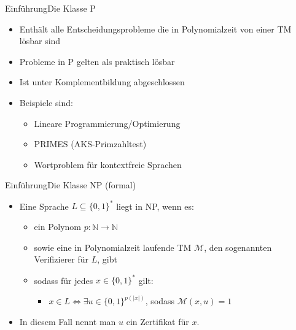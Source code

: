 \documentclass[ignorenonframetext,]{beamer}
\begin{document}
\begin{frame}{Einführung}{Die Klasse P}

\begin{itemize}
\itemsep1pt\parskip0pt
\item
  Enthält alle Entscheidungsprobleme die in Polynomialzeit von einer TM
  lösbar sind
\item
  Probleme in P gelten als praktisch lösbar
\item
  Ist unter Komplementbildung abgeschlossen
\item
  Beispiele sind:

  \begin{itemize}
  \itemsep1pt\parskip0pt
  \item
    Lineare Programmierung/Optimierung
  \item
    PRIMES (AKS-Primzahltest)
  \item Wortproblem für kontextfreie Sprachen
  \end{itemize}
\end{itemize}

\end{frame}

\begin{frame}{Einführung}{Die Klasse NP (formal)}

\begin{itemize}
\itemsep1pt\parskip0pt
\item
  Eine Sprache $L \subseteq \{0, 1\}^*$ liegt in NP, wenn es:

  \begin{itemize}
  \itemsep1pt\parskip0pt
  \item
    ein Polynom $p: \mathbb{N} \rightarrow \mathbb{N}$
  \item
    sowie eine in Polynomialzeit laufende TM $\mathcal{M}$, den
    sogenannten Verifizierer für $L$, gibt
  \item
    sodass für jedes $x \in \{0, 1\}^*$ gilt:

    \begin{itemize}
    \itemsep1pt\parskip0pt
    \item
      $x \in L \Leftrightarrow \exists u \in \{0, 1\}^{p(|x|)}$, sodass
      $\mathcal{M}(x, u) = 1$
    \end{itemize}
  \end{itemize}
\item
  In diesem Fall nennt man $u$ ein Zertifikat für $x$.
\end{itemize}

\end{frame}
\end{document}
